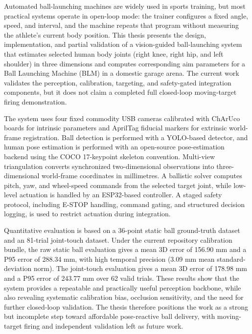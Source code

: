 
Automated ball-launching machines are widely used in sports training, but most practical systems operate in open-loop mode: the trainer configures a fixed angle, speed, and interval, and the machine repeats that program without measuring the athlete's current body position. This thesis presents the design, implementation, and partial validation of a vision-guided ball-launching system that estimates selected human body joints (right knee, right hip, and left shoulder) in three dimensions and computes corresponding aim parameters for a Ball Launching Machine (BLM) in a domestic garage arena. The current work validates the perception, calibration, targeting, and safety-gated integration components, but it does not claim a completed full closed-loop moving-target firing demonstration.

The system uses four fixed commodity USB cameras calibrated with ChArUco boards for intrinsic parameters and AprilTag fiducial markers for extrinsic world-frame registration. Ball detection is performed with a YOLO-based detector, and human pose estimation is performed with an open-source pose-estimation backend using the COCO 17-keypoint skeleton convention. Multi-view triangulation converts synchronized two-dimensional observations into three-dimensional world-frame coordinates in millimetres. A ballistic solver computes pitch, yaw, and wheel-speed commands from the selected target joint, while low-level actuation is handled by an ESP32-based controller. A staged safety protocol, including E-STOP handling, command gating, and structured decision logging, is used to restrict actuation during integration.

Quantitative evaluation is based on a 36-point static ball ground-truth dataset and an 81-trial joint-touch dataset. Under the current repository calibration bundle, the raw static ball evaluation gives a mean 3D error of 156.90 mm and a P95 error of 288.34 mm, with high temporal precision (3.09 mm mean standard-deviation norm). The joint-touch evaluation gives a mean 3D error of 178.98 mm and a P95 error of 243.77 mm over 62 valid trials. These results show that the system provides a repeatable and practically useful perception backbone, while also revealing systematic calibration bias, occlusion sensitivity, and the need for further closed-loop validation. The thesis therefore positions the work as a strong but incomplete step toward affordable pose-reactive ball delivery, with moving-target firing and independent validation left as future work.
